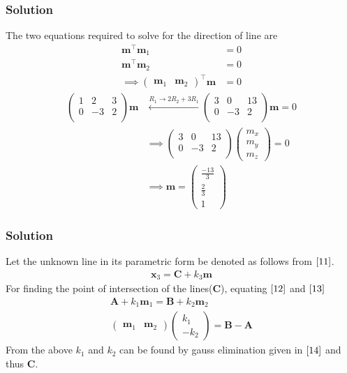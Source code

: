 \documentclass{beamer}
\theoremstyle{remark}
\newcommand{\myvec}[1]{\ensuremath{\begin{pmatrix}#1\end{pmatrix}}}
\let\vec\mathbf
\begin{document}
\begin{frame}
\frametitle{Solution}
The two equations required to solve for the direction of line are 
\begin{align}
\vec{m}^\top\vec{m}_1 &= 0\\
\vec{m}^\top\vec{m}_2 &= 0\\
	\implies \myvec{\vec{m}_1 &\vec{m}_2}^{\top}\vec{m} &= 0
\end{align}
\begin{align}
    \myvec{
        1 & 2 & 3\\
        0 & -3 & 2   \\
    }\vec{m} &\xleftarrow{R_1 \to 2R_2 + 3R_1} \myvec{
        3 & 0 & 13\\
        0 & -3 & 2   \\
    }\vec{m} = 0\\
  &\implies  \myvec{
        3 & 0 & 13\\
        0 & -3 & 2   \\
    }\myvec{
        m_x\\
        m_y\\
        m_z
    } = 0\\
    &\implies \vec{m} = \myvec{
        \frac{-13}{3}\\
        \frac{2}{3}\\
        1
    }
\end{align}
\end{frame}









\begin{frame}
\frametitle{Solution}
Let the unknown line in its parametric form be denoted as follows from $\eqref{11}$.
\begin{align}
    \vec{x}_3 = \vec{C} + k_3\vec{m}
\end{align}
For finding the point of intersection of the lines($\vec{C}$), equating $\eqref{12}$ and $\eqref{13}$
\begin{align}
    \vec{A} + k_1\vec{m}_1 = \vec{B} + k_2\vec{m}_2\\
    \myvec{
        \vec{m}_1 & \vec{m}_2
    }\myvec{
        k_1 \\
        -k_2
    } = \vec{B}-\vec{A}
\end{align}
From the above $k_1$ and $k_2$ can be found by gauss elimination given in $\eqref{14}$ and thus $\vec{C}$.

\end{frame}
\end{document}
